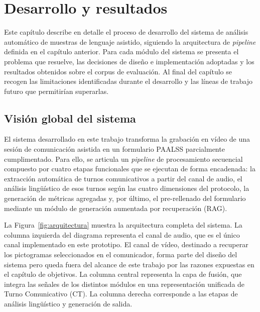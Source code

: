 \chapter{Desarrollo y resultados}
\label{chap:desarrollo}

Este capítulo describe en detalle el proceso de desarrollo del sistema de análisis
automático de muestras de lenguaje asistido, siguiendo la arquitectura de
\emph{pipeline} definida en el capítulo anterior. Para cada módulo del sistema se
presenta el problema que resuelve, las decisiones de diseño e implementación adoptadas
y los resultados obtenidos sobre el corpus de evaluación. Al final del capítulo se
recogen las limitaciones identificadas durante el desarrollo y las líneas de trabajo
futuro que permitirían superarlas.


\section{Visión global del sistema}
\label{sec:vision_global}

El sistema desarrollado en este trabajo transforma la grabación en vídeo de una sesión
de comunicación asistida en un formulario \ac{PAALSS} parcialmente cumplimentado. Para
ello, se articula un \emph{pipeline} de procesamiento secuencial compuesto por cuatro
etapas funcionales que se ejecutan de forma encadenada: la extracción automática de
turnos comunicativos a partir del canal de audio, el análisis lingüístico de esos
turnos según las cuatro dimensiones del protocolo, la generación de métricas agregadas
y, por último, el pre-rellenado del formulario mediante un módulo de generación
aumentada por recuperación (\ac{RAG}).

La Figura~\ref{fig:arquitectura} muestra la arquitectura completa del sistema. La
columna izquierda del diagrama representa el canal de audio, que es el único canal
implementado en este prototipo. El canal de vídeo, destinado a recuperar los
pictogramas seleccionados en el comunicador, forma parte del diseño del sistema pero
queda fuera del alcance de este trabajo por las razones expuestas en el capítulo de
objetivos. La columna central representa la capa de fusión, que integra las señales de
los distintos módulos en una representación unificada de Turno Comunicativo (\ac{CT}).
La columna derecha corresponde a las etapas de análisis lingüístico y generación de
salida.

